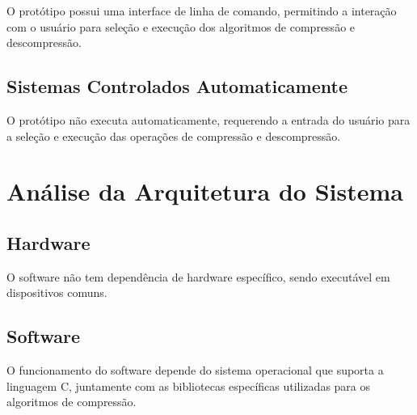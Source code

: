 O protótipo possui uma interface de linha de comando, permitindo a interação com o usuário para seleção e execução dos algoritmos de compressão e descompressão.

\subsection{Sistemas Controlados Automaticamente}

O protótipo não executa automaticamente, requerendo a entrada do usuário para a seleção e execução das operações de compressão e descompressão.

\section{Análise da Arquitetura do Sistema}

\subsection{Hardware}

O software não tem dependência de hardware específico, sendo executável em dispositivos comuns.

\subsection{Software}

O funcionamento do software depende do sistema operacional que suporta a linguagem C, juntamente com as bibliotecas específicas utilizadas para os algoritmos de compressão.
